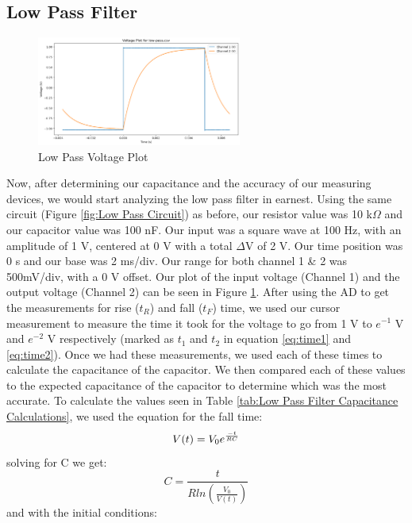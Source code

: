 \documentclass{article}
\begin{document}
\subsection{Low Pass Filter}
\begin{figure}
    \centering
    \includegraphics[width=0.6\textwidth]{Images/low-pass-voltage.png}
    \caption{Low Pass Voltage Plot}
    \label{fig:Low Pass Voltage Plot}
\end{figure}
Now, after determining our capacitance and the accuracy of our measuring devices, we would start analyzing the low pass filter in earnest. Using the same circuit (Figure \ref{fig:Low Pass Circuit}) as before, our resistor value was 10 k$\Omega$ and our capacitor value was 100 nF. Our input was a square wave at 100 Hz, with an amplitude of 1 V, centered at 0 V with a total $\Delta$V of 2 V. Our time position was 0 s and our base was 2 ms/div. Our range for both channel 1 \& 2 was 500mV/div, with a 0 V offset. Our plot of the input voltage (Channel 1) and the output voltage (Channel 2) can be seen in Figure \ref{fig:Low Pass Voltage Plot}. After using the AD to get the measurements for rise ($t_R$) and fall ($t_F$) time, we used our cursor measurement to measure the time it took for the voltage to go from 1 V to $e^{-1}$ V and $e^{-2}$ V respectively (marked as $t_1$ and $t_2$ in equation \ref{eq:time1} and \ref{eq:time2}). Once we had these measurements, we used each of these times to calculate the capacitance of the capacitor. We then compared each of these values to the expected capacitance of the capacitor to determine which was the most accurate. To calculate the values seen in Table \ref{tab:Low Pass Filter Capacitance Calculations}, we used the equation for the fall time: 
\begin{equation}
    V(t) = V_0e^{\frac{-t}{RC}}\\
\end{equation}
solving for C we get:
\begin{equation}
    C = \frac{t}{Rln(\frac{V_0}{V(t)})}
\end{equation}
and with the initial conditions:
\end{document}
